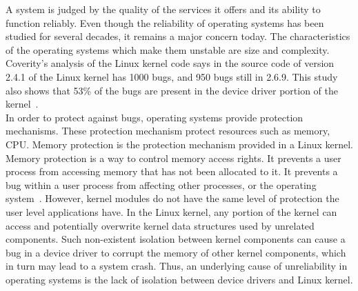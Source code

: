 A system is judged by the quality of the services it offers and its ability to function reliably. Even though the reliability of operating systems has been studied for several decades, it remains a major concern today. The characteristics of the operating systems which make them unstable are size and complexity. 
\\[3mm]
Coverity's analysis of the Linux kernel code says in the source code of version 2.4.1 of the Linux kernel has 1000 bugs, and 950 bugs still in 2.6.9. This study also shows that 53\% of the bugs are present in the device driver portion of the kernel~\cite{coveritykernel}. 
\\[3mm]
In order to protect against bugs, operating systems provide protection mechanisms. These protection mechanism protect resources such as memory, CPU.
Memory protection is the protection mechanism provided in a Linux kernel. Memory protection is a way to control memory access rights. It prevents a user process from accessing memory that has not been allocated to it. It prevents a bug within a user process from affecting other processes, or the operating system~\cite{Denning:1970:VM:356571.356573, Galvin}. However, kernel modules do not have the same level of protection the user level applications have. In the Linux kernel, any portion of the kernel can access and potentially overwrite kernel data structures used by unrelated components. Such non-existent isolation between kernel components can cause a bug in a device driver to corrupt the memory of other kernel components, which in turn may lead to a system crash. Thus, an underlying cause of unreliability in operating systems is the lack of isolation between device drivers and Linux kernel.


